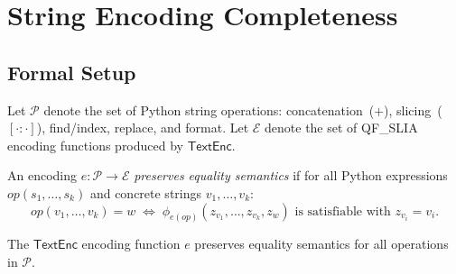 \documentclass[11pt]{article}
\newcommand{\TextEnc}{\ensuremath{\mathsf{TextEnc}}}
\newcommand{\QFSLIA}{\textsf{QF\_SLIA}}
\begin{document}
\section{String Encoding Completeness}
\label{sec:theorem}

\subsection{Formal Setup}
\label{sec:formal}

Let $\mathcal{P}$ denote the set of Python string operations:
concatenation~($+$), slicing~($[\cdot:\cdot]$), find/index, replace, and
format.  Let $\mathcal{E}$ denote the set of \QFSLIA{} encoding functions
produced by \TextEnc.

\begin{definition}
\label{def:eq-pres}
An encoding $e : \mathcal{P} \to \mathcal{E}$ \emph{preserves equality
semantics} if for all Python expressions $\mathit{op}(s_1, \ldots, s_k)$
and concrete strings $v_1, \ldots, v_k$:
\[
  \mathit{op}(v_1, \ldots, v_k) = w
  \;\iff\;
  \phi_{e(\mathit{op})}(z_{v_1}, \ldots, z_{v_k}, z_w) \text{ is satisfiable
  with } z_{v_i} = v_i.
\]
\end{definition}

\begin{theorem}
\label{thm:completeness}
The \TextEnc{} encoding function $e$ preserves equality semantics for all
operations in $\mathcal{P}$.
\end{theorem}
\end{document}

